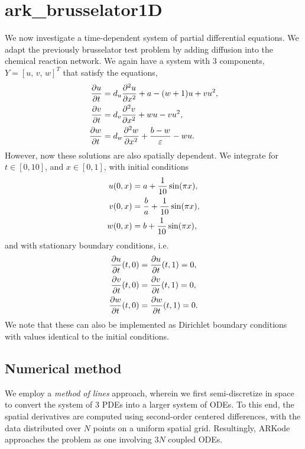 \documentclass[letterpaper,10pt,english]{sphinxmanual}
\begin{document}
\section{ark\_brusselator1D}
\label{c_serial:ark-brusselator1d}\label{c_serial:id16}
We now investigate a time-dependent system of partial differential
equations.  We adapt the previously brusselator test problem by adding
diffusion into the chemical reaction network.  We again have a system
with 3 components, $Y = [u,\, v,\, w]^T$ that satisfy the equations,
\begin{gather}
\begin{split}\frac{\partial u}{\partial t} &= d_u \frac{\partial^2 u}{\partial
   x^2} + a - (w+1) u + v u^2, \\
\frac{\partial v}{\partial t} &= d_v \frac{\partial^2 v}{\partial
   x^2} + w u - v u^2, \\
\frac{\partial w}{\partial t} &= d_w \frac{\partial^2 w}{\partial
   x^2} + \frac{b-w}{\varepsilon} - w u.\end{split}\notag
\end{gather}
However, now these solutions are also spatially dependent.  We
integrate for $t \in [0, 10]$, and $x \in [0, 1]$, with
initial conditions
\begin{gather}
\begin{split}u(0,x) &=  a + \frac{1}{10} \sin(\pi x),\\
v(0,x) &= \frac{b}{a} + \frac{1}{10}\sin(\pi x),\\
w(0,x) &=  b + \frac{1}{10}\sin(\pi x),\end{split}\notag
\end{gather}
and with stationary boundary conditions, i.e.
\begin{gather}
\begin{split}\frac{\partial u}{\partial t}(t,0) &= \frac{\partial u}{\partial t}(t,1) = 0,\\
\frac{\partial v}{\partial t}(t,0) &= \frac{\partial v}{\partial t}(t,1) = 0,\\
\frac{\partial w}{\partial t}(t,0) &= \frac{\partial w}{\partial t}(t,1) = 0.\end{split}\notag
\end{gather}
We note that these can also be implemented as Dirichlet boundary
conditions with values identical to the initial conditions.


\subsection{Numerical method}
\label{c_serial:id17}
We employ a \emph{method of lines} approach, wherein we first
semi-discretize in space to convert the system of 3 PDEs into a larger
system of ODEs.  To this end, the spatial derivatives are computed
using second-order centered differences, with the data distributed
over $N$ points on a uniform spatial grid.  Resultingly, ARKode
approaches the problem as one involving $3N$ coupled ODEs.
\end{document}
